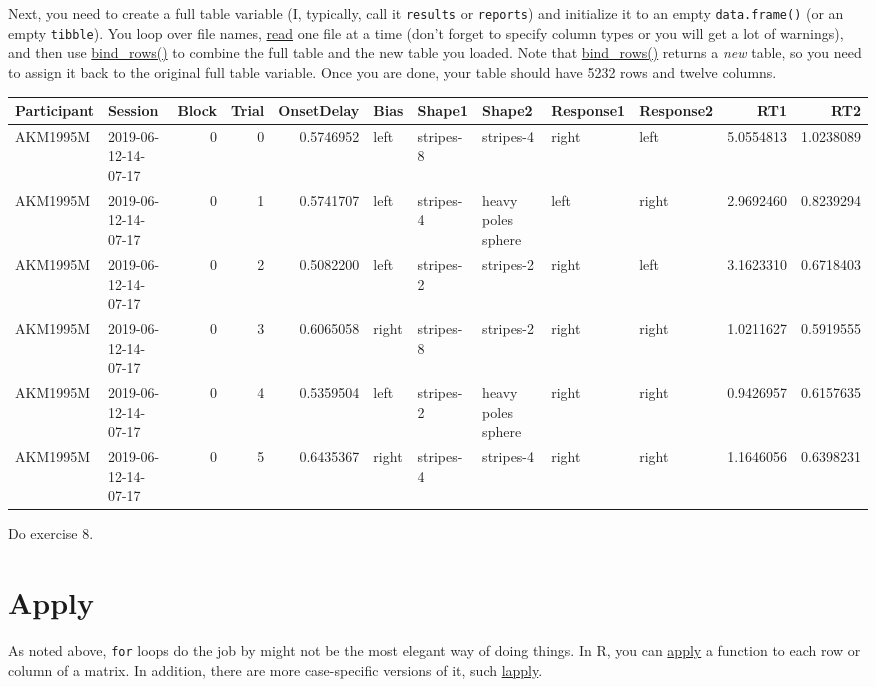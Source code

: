 \documentclass[
]{book}
\begin{document}
Next, you need to create a full table variable (I, typically, call it \texttt{results} or \texttt{reports}) and initialize it to an empty \texttt{data.frame()} (or an empty \texttt{tibble}). You loop over file names, \protect\hyperlink{readr}{read} one file at a time (don't forget to specify column types or you will get a lot of warnings), and then use \href{https://dplyr.tidyverse.org/reference/bind.html}{bind\_rows()} to combine the full table and the new table you loaded. Note that \href{https://dplyr.tidyverse.org/reference/bind.html}{bind\_rows()} returns a \emph{new} table, so you need to assign it back to the original full table variable. Once you are done, your table should have 5232 rows and twelve columns.

\begin{tabular}{l|l|r|r|r|l|l|l|l|l|r|r}
\hline
Participant & Session & Block & Trial & OnsetDelay & Bias & Shape1 & Shape2 & Response1 & Response2 & RT1 & RT2\\
\hline
AKM1995M & 2019-06-12-14-07-17 & 0 & 0 & 0.5746952 & left & stripes-8 & stripes-4 & right & left & 5.0554813 & 1.0238089\\
\hline
AKM1995M & 2019-06-12-14-07-17 & 0 & 1 & 0.5741707 & left & stripes-4 & heavy poles sphere & left & right & 2.9692460 & 0.8239294\\
\hline
AKM1995M & 2019-06-12-14-07-17 & 0 & 2 & 0.5082200 & left & stripes-2 & stripes-2 & right & left & 3.1623310 & 0.6718403\\
\hline
AKM1995M & 2019-06-12-14-07-17 & 0 & 3 & 0.6065058 & right & stripes-8 & stripes-2 & right & right & 1.0211627 & 0.5919555\\
\hline
AKM1995M & 2019-06-12-14-07-17 & 0 & 4 & 0.5359504 & left & stripes-2 & heavy poles sphere & right & right & 0.9426957 & 0.6157635\\
\hline
AKM1995M & 2019-06-12-14-07-17 & 0 & 5 & 0.6435367 & right & stripes-4 & stripes-4 & right & right & 1.1646056 & 0.6398231\\
\hline
\end{tabular}

Do exercise 8.

\hypertarget{apply}{%
\section{Apply}\label{apply}}

As noted above, \texttt{for} loops do the job by might not be the most elegant way of doing things. In R, you can \href{https://stat.ethz.ch/R-manual/R-devel/library/base/html/apply.html}{apply} a function to each row or column of a matrix. In addition, there are more case-specific versions of it, such \href{https://stat.ethz.ch/R-manual/R-devel/library/base/html/lapply.html}{lapply}.
\end{document}
